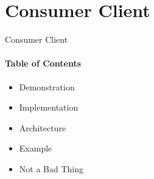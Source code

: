 \section{Consumer Client}
\author{Kasper}

\begin{frame}{Consumer Client}
    \framesubtitle{Table of Contents}

    \begin{itemize}
        \item Demonstration
        \item Implementation
        \item Architecture
        \item Example
        \item Not a Bad Thing
    \end{itemize}
\end{frame}

